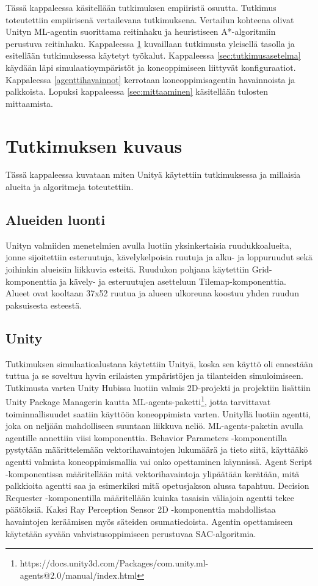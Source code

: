 \documentclass[utf8]{gradu3}
\begin{document}
Tässä kappaleessa käsitellään tutkimuksen empiiristä osuutta. Tutkimus toteutettiin empiirisenä vertailevana tutkimuksena. Vertailun kohteena olivat Unityn ML-agentin suorittama reitinhaku ja heuristiseen A*-algoritmiin perustuva reitinhaku. Kappaleessa \ref{sec:tutkimuksenkuvaus} kuvaillaan tutkimusta yleisellä tasolla ja esitellään tutkimuksessa käytetyt työkalut. Kappaleessa \ref{sec:tutkimusasetelma} käydään läpi simulaatioympäristöt ja koneoppimiseen liittyvät konfiguraatiot. Kappaleessa \ref{agenttihavainnot} kerrotaan koneoppimisagentin havainnoista ja palkkoista. Lopuksi kappaleessa \ref{sec:mittaaminen} käsitellään tulosten mittaamista.

\section{Tutkimuksen kuvaus}
\label{sec:tutkimuksenkuvaus}

Tässä kappaleessa kuvataan miten Unityä käytettiin tutkimuksessa ja millaisia alueita ja algoritmeja toteutettiin.

\subsection{Alueiden luonti}

Unityn valmiiden menetelmien avulla luotiin yksinkertaisia ruudukkoalueita, jonne sijoitettiin esteruutuja, kävelykelpoisia ruutuja ja alku- ja loppuruudut sekä joihinkin alueisiin liikkuvia esteitä. Ruudukon pohjana käytettiin Grid-komponenttia ja kävely- ja esteruutujen asetteluun Tilemap-komponenttia. Alueet ovat kooltaan 37x52 ruutua ja alueen ulkoreuna koostuu yhden ruudun paksuisesta esteestä.

\subsection{Unity}

Tutkimuksen simulaatioalustana käytettiin Unityä, koska sen käyttö oli ennestään tuttua ja se soveltuu hyvin erilaisten ympäristöjen ja tilanteiden simuloimiseen. Tutkimusta varten Unity Hubissa luotiin valmis 2D-projekti ja projektiin lisättiin Unity Package Managerin kautta ML-agents-paketti\footnote{https://docs.unity3d.com/Packages/com.unity.ml-agents@2.0/manual/index.html}, jotta tarvittavat toiminnallisuudet saatiin käyttöön koneoppimista varten. Unityllä luotiin agentti, joka on neljään mahdolliseen suuntaan liikkuva neliö. ML-agents-paketin avulla agentille annettiin viisi komponenttia. Behavior Parameters -komponentilla pystytään määrittelemään vektorihavaintojen lukumäärä ja tieto siitä, käyttääkö agentti valmista koneoppimismallia vai onko opettaminen käynnissä. Agent Script -komponentissa määritellään mitä vektorihavaintoja ylipäätään kerätään, mitä palkkioita agentti saa ja esimerkiksi mitä opetusjakson alussa tapahtuu. Decision Requester -komponentilla määritellään kuinka tasaisin väliajoin agentti tekee päätöksiä. Kaksi Ray Perception Sensor 2D -komponenttia mahdollistaa havaintojen keräämisen myös säteiden osumatiedoista. Agentin opettamiseen käytetään syvään vahvistusoppimiseen perustuvaa SAC-algoritmia.
\end{document}
